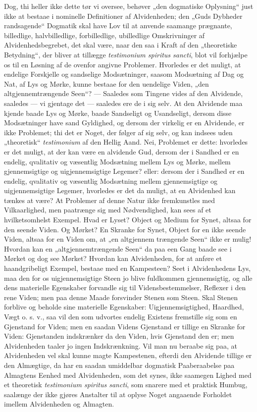 \documentclass[11pt]{book}
\newcommand{\opage}[1]{\marginnote{\footnotesize\textit{[#1]}}}
\begin{document}
Dog, thi heller ikke dette tør vi oversee, behøver „den dogmatiske
Oplysning“ just ikke at bestaae i nominelle Definitioner af
Alvidenheden; den „Guds Dybheder randsagende“ Dogmatik skal have Lov
til at anvende saamange prægnante, billedlige, halvbilledlige,
forbilledlige, ubilledlige Omskrivninger af Alvidenhedsbegrebet, det
skal være, naar den saa i Kraft af den „theoretiske Betydning“, der
bliver at tillægge \textit{testimonium spiritus sancti}, blot vil
forhjælpe os til en Løsning af de ovenfor angivne Problemer.
Hvorledes er det muligt, at endelige Forskjelle og sandselige
Modsætninger, saasom Modsætning af Dag og Nat, af Lys og Mørke,
kunne bestaae for den uendelige Viden, „den altgjennemtrængende
Seen“? --- Saaledes som Tingene vides af den Alvidende, saaledes ---
vi gjentage det --- saaledes ere de i sig selv. At den Alvidende maa
kjende baade Lys og Mørke, baade Sandseligt og Usandseligt, dersom
disse Modsætninger have sand Gyldighed, og dersom der virkelig er en
Alvidende, er ikke Problemet; thi det er Noget, der følger af sig
selv, og kan indsees uden „theoretisk“ \textit{testimonium} af den
Hellig Aand. Nei, Problemet er dette: hvorledes er det muligt, at
der kan være en alvidende Gud, dersom der i Sandhed er en endelig,
qvalitativ og væsentlig Modsætning mellem Lys og Mørke, mellem
gjennemsigtige og uigjennemsigtige Legemer? eller: dersom der i
Sandhed er en endelig, qvalitativ og væsentlig Modsætning mellem
gjennemsigtige og uigjennemsigtige Legemer, hvorledes er det da
muligt, at en Alvidenhed kan tænkes at være? At Problemer af denne
Natur ikke fremkunstles med Vilkaarlighed, men paatrænge sig med
Nødvendighed, kan sees af et hvilketsomhelst Exempel. Hvad er
Lyset? Object og Medium for Synet, altsaa for den seende Viden. Og
Mørket? En Skranke for Synet, Object for en ikke seende Viden,
altsaa for en Viden om, at „en altgjennem\-%
\opage{52} \setcounter{footnote}{0}%
trængende Seen“ ikke er mulig! Hvordan kan en „altgjennemtrængende
Seen“ da paa een Gang baade see i Mørket og dog see Mørket? Hvordan
kan Alvidenheden, for at anføre et haandgribeligt Exempel, bestaae
med en Kampesteen? Seet i Alvidenhedens Lys, maa den for os
uigjennemsigtige Steen jo blive fuldkommen gjennemsigtig, og alle
dens materielle Egenskaber forvandle sig til Vidensbestemmelser,
Reflexer i den rene Viden; men paa denne Maade forsvinder Stenen som
Steen. Skal Stenen forblive og beholde sine materielle Egenskaber:
Uigjennemsigtighed, Haardhed, Vægt o. s. v., saa vil den som
udvortes endelig Existens fremstille sig som en Gjenstand for Viden;
men en saadan Videns Gjenstand er tillige en Skranke for Viden:
Gjenstanden indskrænker da den Viden, hvis Gjenstand den er; men
Alvidenheden taaler jo ingen Indskrænkning. Vil man nu beraabe sig
paa, at Alvidenheden vel skal kunne magte Kampestenen, efterdi den
Alvidende tillige er den Almægtige, da har en saadan umiddelbar
dogmatisk Paaberaabelse paa Almagtens Eenhed med Alvidenheden, som
det synes, ikke saamegen Lighed med et theoretisk \textit{testimonium
spiritus sancti}, som snarere med et praktisk Humbug, saalænge der
ikke gjøres Anstalter til at oplyse Noget angaaende Forholdet
imellem Alvidenheden og Almagten.
\end{document}
